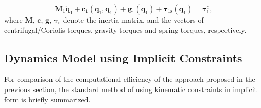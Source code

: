\documentclass[twocolumn,10pt]{IFTOMM}
\newcommand{\bm}[1]{\boldsymbol{#1}}
\begin{document}
%
\begin{equation}
\bm{M}_1\ddot{\bm{q}}_1+\bm{c}_1(\bm{q}_1,\dot{\bm{q}}_1)+\bm{g}_1(\bm{q}_1) + \bm{\tau}_{1\mathrm{s}}(\bm{q}_1) = \bm{\tau}^c_1,
\label{equ:Dyn_MinKoord}
\end{equation}
%
where $\bm{M}$, $\bm{c}$, $\bm{g}$, $\bm{\tau}_{\mathrm{s}}$ denote the inertia matrix, and the vectors of centrifugal/Coriolis torques, gravity torques and spring torques, respectively.

%


\subsection{Dynamics Model using Implicit Constraints}
\label{sec:DynamicsImpl}

For comparison of the computational efficiency of the approach proposed in the previous section, the standard method \cite{NakamuraGho1989,ParkChoPlo1999,KhalilBen1995,SaminFis2013} of using kinematic constraints in implicit form is briefly summarized.
\end{document}
